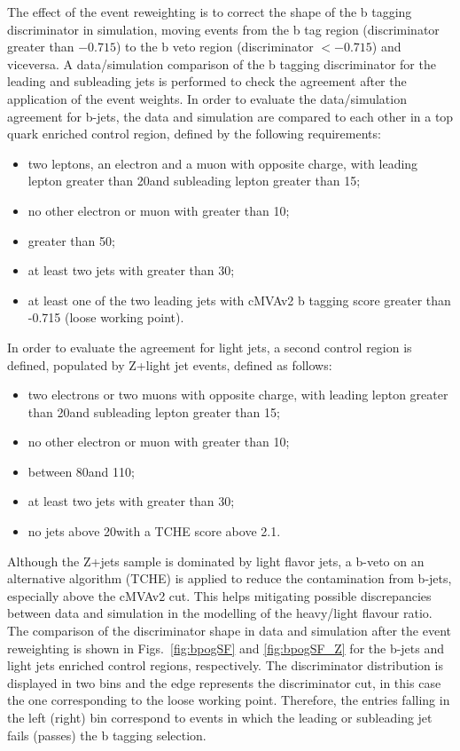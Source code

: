 The effect of the event reweighting is to correct the shape of the b tagging discriminator in simulation, moving events from the b tag region (discriminator greater than $-0.715$) to the b veto region (discriminator $ < -0.715$) and viceversa. A data/simulation comparison of the b tagging discriminator for the leading and subleading jets is performed to check the agreement after the application of the event weights. In order to evaluate the data/simulation agreement for b-jets, the data and simulation are compared to each other in a top quark enriched control region, defined by the following requirements:
\begin{itemize}
\item two leptons, an electron and a muon with opposite charge, with
leading lepton \pt greater than 20\GeV and subleading lepton \pt greater than 15\GeV;
\item no other electron or muon with \pt greater than 10\GeV;
\item \mll greater than 50\GeV;
\item at least two jets with \pt greater than 30\GeV;
\item at least one of the two leading jets with cMVAv2 b tagging score
greater than -0.715 (loose working point).
\end{itemize}
In order to evaluate the agreement for light jets, a second
control region is defined, populated by Z+light jet events, defined as follows:
\begin{itemize}
\item two electrons or two muons with opposite charge, with
leading lepton \pt greater than 20\GeV and subleading lepton \pt greater than 15\GeV;
\item no other electron or muon with \pt greater than 10\GeV;
\item \mll between 80\GeV and 110\GeV;
\item at least two jets with \pt greater than 30\GeV;
\item no jets above 20\GeV with a TCHE score above 2.1. 
\end{itemize}
Although the Z+jets sample is dominated by light flavor jets, a b-veto on an
alternative algorithm (TCHE) is applied to reduce the contamination from b-jets,
especially above the cMVAv2 cut. This helps mitigating possible discrepancies between data and simulation in the modelling of the heavy/light flavour ratio.
The comparison of the discriminator shape in data and simulation after the event reweighting is shown in Figs.~\ref{fig:bpogSF} and \ref{fig:bpogSF_Z} for the b-jets and light jets enriched control regions, respectively. The discriminator distribution is displayed in two bins and the edge represents the discriminator cut, in this case the one corresponding to the loose working point. Therefore, the entries falling in the left (right) bin correspond to events in which the leading or subleading jet fails (passes) the b tagging selection.

